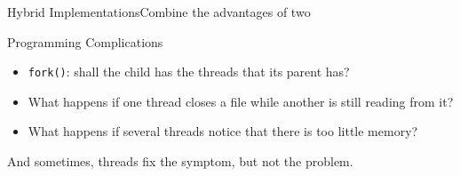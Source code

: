 \begin{frame}{Hybrid Implementations}{Combine the advantages of two}
  \begin{center}
  \end{center}
\end{frame}



\begin{frame}{Programming Complications}
  \begin{itemize}
  \item \texttt{fork()}: shall the child has the threads that its parent has?
  \item What happens if one thread closes a file while another is still reading from it?
  \item What happens if several threads notice that there is too little memory?
  \end{itemize}
  \alert{And sometimes, threads fix the symptom, but not the problem.}
\end{frame}

